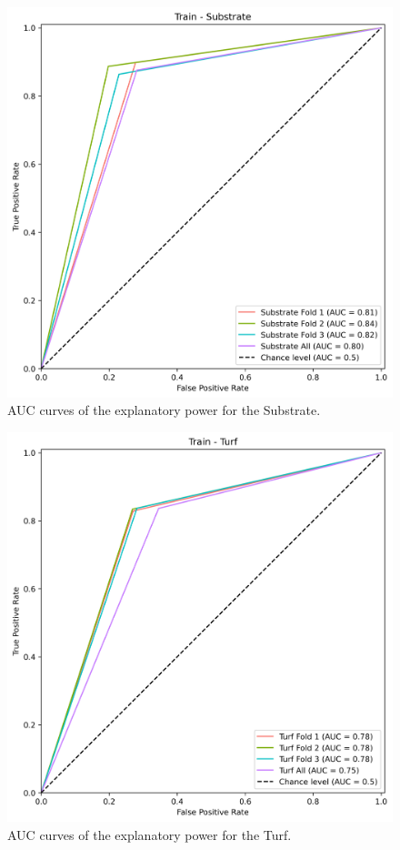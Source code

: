 \begin{figure}
\hypertarget{fig:chap3figS20}{%
\centering
\includegraphics{03-Chapitre3/figures/supplementary/03-receiver_operator_curve_train_rf_Substrate.png}
\caption{AUC curves of the explanatory power for the
Substrate.}\label{fig:chap3figS20}
}
\end{figure}

\begin{figure}
\hypertarget{fig:chap3figS21}{%
\centering
\includegraphics{03-Chapitre3/figures/supplementary/03-receiver_operator_curve_train_rf_Turf.png}
\caption{AUC curves of the explanatory power for the
Turf.}\label{fig:chap3figS21}
}
\end{figure}

